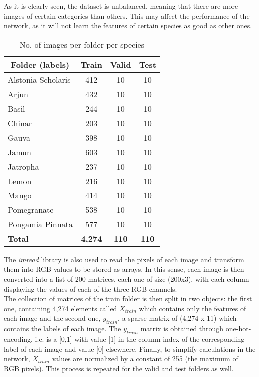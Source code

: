 \documentclass[11pt]{article}
\begin{document}
As it is clearly seen, the dataset is unbalanced, meaning that there are more images of certain categories than others. This may affect the performance of the network, as it will not learn the features of certain species as good as other ones.\\

\begin{table}[H]
    \begin{center}
    
    \begin{tabular}{lccc}
    \multicolumn{1}{c}{\textbf{Folder (labels)}} & \multicolumn{1}{c}{\textbf{Train}} & \multicolumn{1}{c}{\textbf{Valid}} & \multicolumn{1}{c}{\textbf{Test}} \\ \hline
        Alstonia Scholaris & 412 & 10 & 10\\
        Arjun & 432 & 10 & 10\\
        Basil & 244 & 10 & 10 \\
        Chinar & 203 & 10 & 10 \\
        Gauva & 398 & 10 & 10\\
        Jamun & 603 & 10 & 10\\
        Jatropha & 237 & 10 & 10\\
        Lemon & 216 & 10 & 10\\
        Mango & 414 & 10 & 10\\
        Pomegranate & 538 & 10 & 10\\
        Pongamia Pinnata & 577 & 10 & 10\\ \hline
        \textbf{Total} & \textbf{4,274} & \textbf{110} & \textbf{110} \\ \hline
    \end{tabular}
    \caption{No. of images per folder per species} \label{tab:tab2}
    
    \end{center}
\end{table}

The \textit{imread} library is also used to read the pixels of each image and transform them into RGB values to be stored as arrays. In this sense, each image is then converted into a list of 200 matrices, each one of size (200x3), with each column displaying the values of each of the three RGB channels.\\ 

The collection of matrices of the train folder is then split in two objects: the first one, containing 4,274 elements called \textit{$X_{train}$} which contains only the features of each image and the second one, \textit{$y_{train}$}, a sparse matrix of (4,274 x 11) which contains the labels of each image. The \textit{$y_{train}$} matrix is obtained through one-hot-encoding, i.e. is a [0,1] with value [1] in the column index of the corresponding label of each image and value [0] elsewhere. Finally, to simplify calculations in the network, \textit{$X_{train}$} values are normalized by a constant of 255 (the maximum of RGB pixels). This process is repeated for the valid and test folders as well.\\
\end{document}
